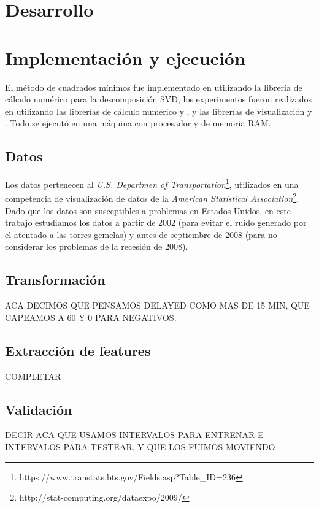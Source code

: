 \section{Desarrollo}\label{sec:desarrollo}

\section{Implementaci\'on y ejecuci\'on}\label{sec:ejecucion}
El m\'etodo de cuadrados m\'inimos fue implementado en  utilizando
la librer\'ia de c\'alculo num\'erico  para la descomposici\'on SVD,
los experimentos fueron realizados en  utilizando las librer\'ias
de c\'alculo num\'erico  y , y
las librer\'ias de visualizaci\'on  y .
Todo se ejecut\'o en una m\'aquina con procesador 
y  de memoria RAM.

\subsection{Datos}\label{subsec:datos}
Los datos pertenecen al \textit{U.S. Departmen of
Transportation}\footnote{https://www.transtats.bts.gov/Fields.asp?Table\_ID=236},
utilizados en una competencia de visualizaci\'on
de datos de la \textit{American Statistical Association}\footnote{
http://stat-computing.org/dataexpo/2009/}.
Dado que los datos son susceptibles a problemas en Estados Unidos, en este trabajo
estudiamos los datos a partir de 2002 (para evitar el ruido generado por el atentado a las torres
gemelas) y antes de septiembre de 2008 (para no considerar los problemas de la recesi\'on de 2008).

\subsection{Transformaci\'on}\label{subsec:transformacion}
ACA DECIMOS QUE PENSAMOS DELAYED COMO MAS DE 15 MIN, QUE CAPEAMOS A 60 Y 0 PARA NEGATIVOS.

\subsection{Extracci\'on de features}\label{subsec:extraccion}
COMPLETAR

\subsection{Validaci\'on}\label{subsec:validacion}
DECIR ACA QUE USAMOS INTERVALOS PARA ENTRENAR E INTERVALOS PARA TESTEAR, Y QUE LOS FUIMOS MOVIENDO